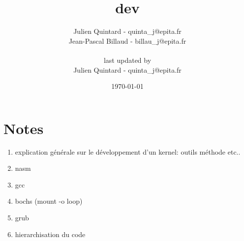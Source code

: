 \documentclass[10pt,a4wide]{article}
\title{dev}
\author{Julien Quintard - \small{quinta\_j@epita.fr} \\
        Jean-Pascal Billaud - \small{billau\_j@epita.fr} \\ \\
	\small{last updated by} \\
	Julien Quintard - \small{quinta\_j@epita.fr}}
\date{\today}
\begin{document}
\maketitle

\section{Notes}

\begin{enumerate}

\item explication g\'en\'erale sur le d\'eveloppement d'un kernel: outils
      m\'ethode etc..

\item nasm

\item gcc

\item bochs (mount -o loop)

\item grub

\item hierarchisation du code

\end{enumerate}
\end{document}

